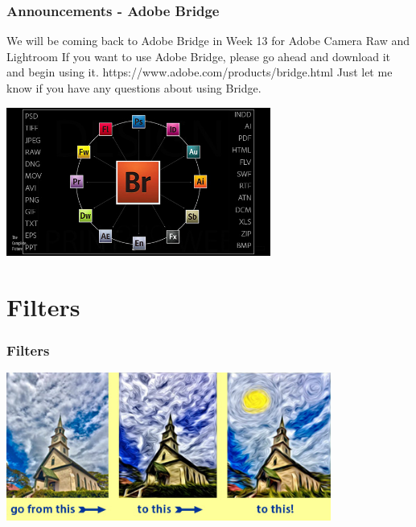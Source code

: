 \documentclass{beamer}
\begin{document}
\begin{frame}
	\frametitle{Announcements - Adobe Bridge}
	\begin{outline}
		\1 We will be coming back to Adobe Bridge in Week 13 for Adobe Camera Raw and Lightroom
		\1 If you want to use Adobe Bridge, please go ahead and download it and begin using it.
		\2 https://www.adobe.com/products/bridge.html
		\1 Just let me know if you have any questions about using Bridge.
	\end{outline}
\begin{center}
	\includegraphics[width = 0.65\textwidth]{images/what-is-adobe-bridge-cc.jpg}
\end{center}
\end{frame}


	\section{Filters}
		\begin{frame}
		\frametitle{Filters}
		\begin{center}
			\includegraphics[width = 0.8\textwidth]{images/66821-20100927_fg01.jpg}
		\end{center}
	\end{frame}
	
\end{document}
